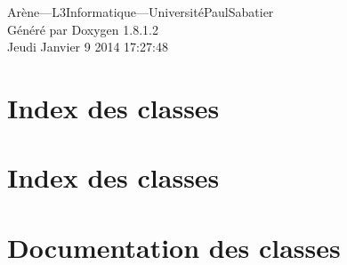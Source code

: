\documentclass{book}
\begin{document}
\hypersetup{pageanchor=false,citecolor=blue}
\begin{titlepage}
\vspace*{7cm}
\begin{center}
{\Large Arène—\-L3\-Informatique—\-Université\-Paul\-Sabatier }\\
\vspace*{1cm}
{\large Généré par Doxygen 1.8.1.2}\\
\vspace*{0.5cm}
{\small Jeudi Janvier 9 2014 17:27:48}\\
\end{center}
\end{titlepage}
\clearemptydoublepage
{}
\tableofcontents
\clearemptydoublepage
{}
\hypersetup{pageanchor=true,citecolor=blue}
\chapter{Index des classes}

\chapter{Index des classes}

\chapter{Documentation des classes}









































\printindex
\end{document}
